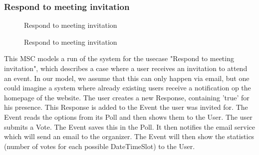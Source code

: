 	\subsubsection{Respond to meeting invitation}
		\begin{figure}[H]
			\centering
			\begin{msc}{Respond to meeting invitation}

				\nextlevel
				\nextlevel
				\nextlevel
				\nextlevel
				\nextlevel

				\nextlevel
				\nextlevel

				\nextlevel
				\nextlevel
				\nextlevel
				\nextlevel
				
				\nextlevel
			\end{msc}
			\caption{Respond to meeting invitation}
			\label{msc:respondinvite}
		\end{figure}

		This MSC models a run of the system for the usecase "Respond to meeting invitation", which describes a case where a user receives an invitation to attend an event. In our model, we assume that this can only happen via email, but one could imagine a system where already existing users receive a notification op the homepage of the website.
		The user creates a new Response, containing 'true' for his presence. This Response is added to the Event the user was invited for. The Event reads the options from its Poll and then shows them to the User. The user submits a Vote. The Event saves this in the Poll.
		It then notifies the email service which will send an email to the organizer.
		The Event will then show the statistics (number of votes for each possible DateTimeSlot) to the User.


